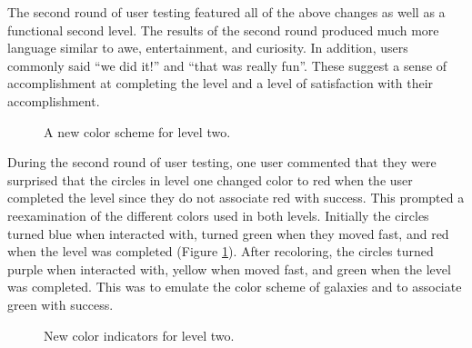 \documentclass[10pt,twocolumn]{article}
\begin{document}
The second round of user testing featured all of the above changes as well as a functional second level.  The results of the second round produced much more language similar to awe, entertainment, and curiosity. In addition, users commonly said ``we did it!'' and ``that was really fun''.  These suggest a sense of accomplishment at completing the level and a level of satisfaction with their accomplishment. 

\begin{figure}[hbh]
\begin{center}
\vspace{.5cm}
\caption{A new color scheme for level two.}
\label{fig:newcolor1}
\end{center}
\end{figure} 

During the second round of user testing, one user commented that they were surprised that the circles in level one changed color to red when the user completed the level since they do not associate red with success.  This prompted a reexamination of the different colors used in both levels. Initially the circles turned blue when interacted with, turned green when they moved fast, and red when the level was completed (Figure \ref{fig:newcolor1}). After recoloring, the circles turned purple when interacted with, yellow when moved fast, and green when the level was completed. This was to emulate the color scheme of galaxies and to associate green with success.  

\begin{figure}[hbh]
\begin{center}
\vspace{.5cm}
\caption{New color indicators for level two.}
\label{fig:newcolor2}
\end{center}
\end{figure} 
\end{document}
